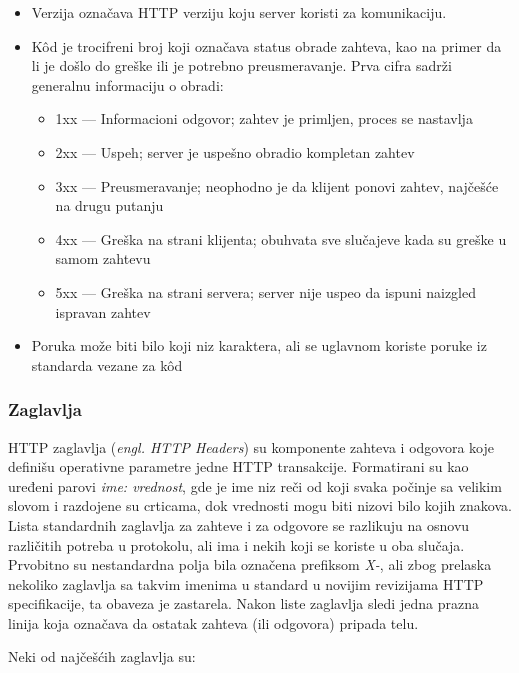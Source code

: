 \documentclass[12pt]{report}
\begin{document}
\begin{itemize}
    \item Verzija označava \acrshort{HTTP} verziju koju server koristi za komunikaciju.
    \item Kôd je trocifreni broj koji označava status obrade zahteva, kao na primer da li je došlo do greške ili je potrebno preusmeravanje. Prva cifra sadrži generalnu informaciju o obradi:
    \begin{itemize}
        \item 1xx --- Informacioni odgovor; zahtev je primljen, proces se nastavlja
        \item 2xx --- Uspeh; server je uspešno obradio kompletan zahtev
        \item 3xx --- Preusmeravanje; neophodno je da klijent ponovi zahtev, najčešće na drugu putanju
        \item 4xx --- Greška na strani klijenta; obuhvata sve slučajeve kada su greške u samom zahtevu
        \item 5xx --- Greška na strani servera; server nije uspeo da ispuni naizgled ispravan zahtev
    \end{itemize}
\item Poruka može biti bilo koji niz karaktera, ali se uglavnom koriste poruke iz standarda vezane za kôd
\end{itemize}

\subsubsection{Zaglavlja}
\acrshort{HTTP} zaglavlja (\textit{engl. HTTP Headers}) su komponente zahteva i odgovora koje definišu operativne parametre jedne \acrshort{HTTP} transakcije. Formatirani su kao uređeni parovi \textit{ime: vrednost}, gde je ime niz reči od koji svaka počinje sa velikim slovom i razdojene su crticama, dok vrednosti mogu biti nizovi bilo kojih znakova. Lista standardnih zaglavlja za zahteve i za odgovore se razlikuju na osnovu različitih potreba u protokolu, ali ima i nekih koji se koriste u oba slučaja. Prvobitno su nestandardna polja bila označena prefiksom \textit{X-}, ali zbog prelaska nekoliko zaglavlja sa takvim imenima u standard u novijim revizijama \acrshort{HTTP} specifikacije, ta obaveza je zastarela. Nakon liste zaglavlja sledi jedna prazna linija koja označava da ostatak zahteva (ili odgovora) pripada telu.

Neki od najčešćih zaglavlja su:
\end{document}
